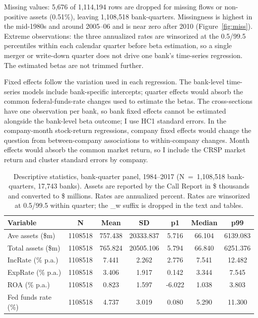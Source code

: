 \documentclass[11pt]{article}
\begin{document}
Missing values: 5,676 of 1,114,194 rows are dropped for missing flows or
non-positive assets (0.51\%), leaving 1,108,518 bank-quarters. Missingness is
highest in the mid-1980s and around 2005--06 and is near zero after 2010
(Figure~\ref{fig:miss}). Extreme observations: the three annualized rates are
winsorized at the 0.5/99.5 percentiles within each calendar quarter before
beta estimation, so a single merger or write-down quarter does not drive one
bank's time-series regression. The estimated betas are not trimmed further.

Fixed effects follow the variation used in each regression. The bank-level
time-series models include bank-specific intercepts; quarter effects would
absorb the common federal-funds-rate changes used to estimate the betas. The
cross-sections have one observation per bank, so bank fixed effects cannot be
estimated alongside the bank-level beta outcome; I use HC1 standard errors.
In the company-month stock-return regressions, company fixed effects would
change the question from between-company associations to within-company
changes. Month effects would absorb the common market return, so I include the
CRSP market return and cluster standard errors by company.

\begin{table}[H]\centering\small
\caption{Descriptive statistics, bank-quarter panel, 1984--2017
(N~=~1,108,518 bank-quarters, 17,743 banks). Assets are reported by the Call
Report in \$ thousands and converted to \$ millions. Rates are annualized
percent. Rates are winsorized at 0.5/99.5 within quarter; the \_w suffix is
dropped in the text and tables.}\label{tab:t1}
\begin{tabular}{lcccccc}\toprule
Variable & N & Mean & SD & p1 & Median & p99\\
\midrule
Ave assets (\$m) & 1108518 & 757.438 & 20333.837 & 5.716 & 66.104 & 6139.083\\
Total assets (\$m) & 1108518 & 765.824 & 20505.106 & 5.794 & 66.840 & 6251.376\\
IncRate (\% p.a.) & 1108518 & 7.441 & 2.262 & 2.776 & 7.541 & 12.482\\
ExpRate (\% p.a.) & 1108518 & 3.406 & 1.917 & 0.142 & 3.344 & 7.545\\
ROA (\% p.a.) & 1108518 & 0.823 & 1.597 & -6.022 & 1.038 & 3.803\\
Fed funds rate (\%) & 1108518 & 4.737 & 3.019 & 0.080 & 5.290 & 11.300\\
\bottomrule
\end{tabular}
\end{table}
\end{document}
